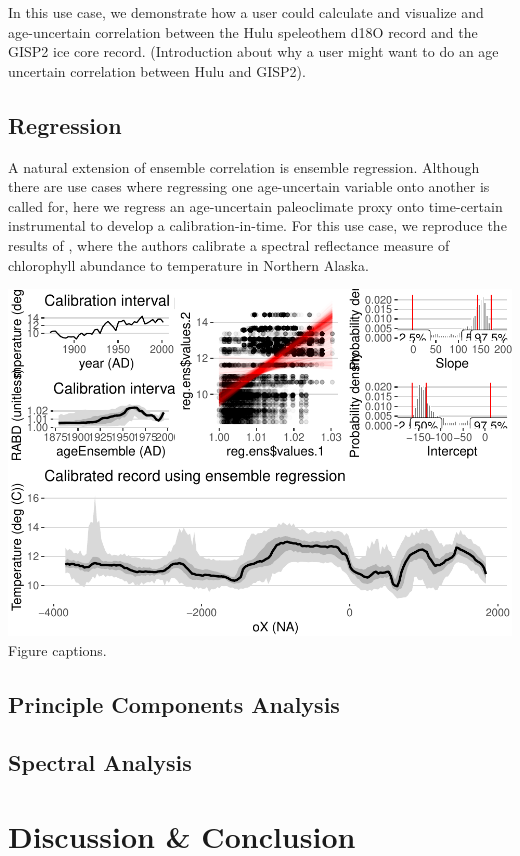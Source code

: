 \documentclass[gc, manuscript]{copernicus}
\begin{document}
In this use case, we demonstrate how a user could calculate and
visualize and age-uncertain correlation between the Hulu speleothem d18O
record and the GISP2 ice core record. (Introduction about why a user
might want to do an age uncertain correlation between Hulu and GISP2).

\subsection{Regression}

A natural extension of ensemble correlation is ensemble regression.
Although there are use cases where regressing one age-uncertain variable
onto another is called for, here we regress an age-uncertain
paleoclimate proxy onto time-certain instrumental to develop a
calibration-in-time. For this use case, we reproduce the results of
\citet{Boldt:2015}, where the authors calibrate a spectral reflectance
measure of chlorophyll abundance to temperature in Northern Alaska.

\includegraphics{geoChronR-paper_files/figure-latex/unnamed-chunk-9-1.pdf}
Figure captions.

\subsection{Principle Components Analysis}

\subsection{Spectral Analysis}

\section{Discussion \& Conclusion}
\end{document}
